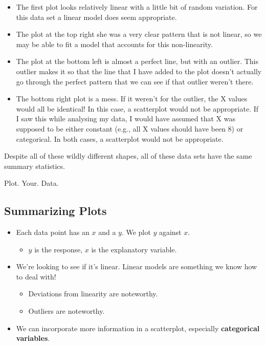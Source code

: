 \documentclass[
  letterpaper,
  DIV=11,
  numbers=noendperiod,
  oneside]{scrreprt}
\providecommand{\tightlist}{%
  \setlength{\itemsep}{0pt}\setlength{\parskip}{0pt}}\usepackage{longtable,booktabs,array}
\begin{document}
\begin{itemize}
\tightlist
\item
  The first plot looks relatively linear with a little bit of random
  variation. For this data set a linear model does seem appropriate.
\item
  The plot at the top right she was a very clear pattern that is not
  linear, so we may be able to fit a model that accounts for this
  non-linearity.
\item
  The plot at the bottom left is almost a perfect line, but with an
  outlier. This outlier makes it so that the line that I have added to
  the plot doesn't actually go through the perfect pattern that we can
  see if that outlier weren't there.
\item
  The bottom right plot is a mess. If it weren't for the outlier, the X
  values would all be identical! In this case, a scatterplot would not
  be appropriate. If I saw this while analysing my data, I would have
  assumed that X was supposed to be either constant (e.g., all X values
  should have been 8) or categorical. In both cases, a scatterplot would
  not be appropriate.
\end{itemize}

Despite all of these wildly different shapes, all of these data sets
have the same summary statistics.

Plot. Your. Data.

\hypertarget{summarizing-plots}{%
\subsection{Summarizing Plots}\label{summarizing-plots}}

\begin{itemize}
\tightlist
\item
  Each data point has an \(x\) and a \(y\). We plot \(y\) against \(x\).

  \begin{itemize}
  \tightlist
  \item
    \(y\) is the response, \(x\) is the explanatory variable.
  \end{itemize}
\item
  We're looking to see if it's linear. Linear models are something we
  know how to deal with!

  \begin{itemize}
  \tightlist
  \item
    Deviations from linearity are noteworthy.
  \item
    Outliers are noteworthy.
  \end{itemize}
\item
  We can incorporate more information in a scatterplot, especially
  \textbf{categorical variables}.
\end{itemize}
\end{document}
